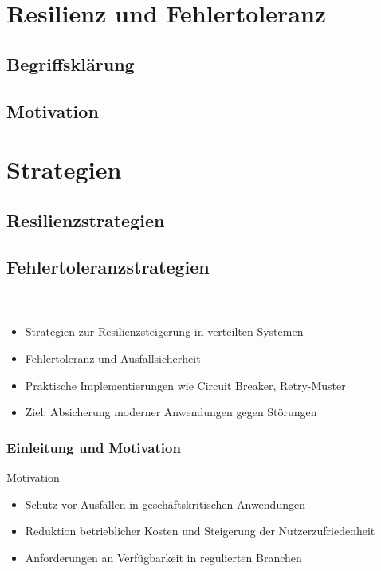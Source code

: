 \section{Resilienz und Fehlertoleranz}
\subsection{Begriffsklärung}
\subsection{Motivation}

\section{Strategien}
\subsection{Resilienzstrategien}
\subsection{Fehlertoleranzstrategien}

\begin{frame}
    \frametitle{\insertsection}
    
    \
    \begin{itemize}
        \item<1-> Strategien zur Resilienzsteigerung in verteilten Systemen
        \item<2-> Fehlertoleranz und Ausfallsicherheit
        \item<3-> Praktische Implementierungen wie Circuit Breaker, Retry-Muster
        \item<4-> Ziel: Absicherung moderner Anwendungen gegen Störungen
    \end{itemize}
\end{frame}


\begin{frame}
    \frametitle{Einleitung und Motivation}
    
    \begin{block}{Motivation}
        \begin{itemize}
            \item Schutz vor Ausfällen in geschäftskritischen Anwendungen
            \item Reduktion betrieblicher Kosten und Steigerung der Nutzerzufriedenheit
            \item Anforderungen an Verfügbarkeit in regulierten Branchen
        \end{itemize}
    \end{block}
\end{frame}

